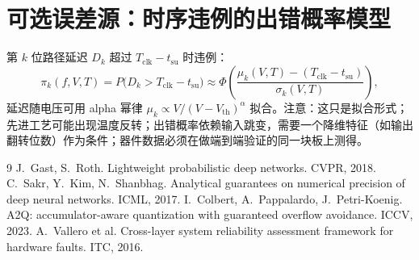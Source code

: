 \documentclass[11pt,a4paper]{ctexart}
\begin{document}
\appendix
\section{可选误差源：时序违例的出错概率模型}
\label{app:timing}
第 $k$ 位路径延迟 $D_k$ 超过 $T_{\text{clk}} - t_{\text{su}}$ 时违例：
\begin{equation}
\pi_k(f,V,T) = P\bigl(D_k > T_{\text{clk}} - t_{\text{su}}\bigr) \approx \Phi\!\left(\frac{\mu_k(V,T) - (T_{\text{clk}} - t_{\text{su}})}{\sigma_k(V,T)}\right),
\end{equation}
延迟随电压可用 alpha 幂律 $\mu_k \propto V/(V - V_{\text{th}})^{\alpha}$ 拟合。注意：这只是拟合形式；先进工艺可能出现温度反转；出错概率依赖输入跳变，需要一个降维特征（如输出翻转位数）作为条件；器件数据必须在做端到端验证的同一块板上测得。

\begin{thebibliography}{9}
 J.~Gast, S.~Roth. Lightweight probabilistic deep networks. CVPR, 2018.
 C.~Sakr, Y.~Kim, N.~Shanbhag. Analytical guarantees on numerical precision of deep neural networks. ICML, 2017.
 I.~Colbert, A.~Pappalardo, J.~Petri-Koenig. A2Q: accumulator-aware quantization with guaranteed overflow avoidance. ICCV, 2023.
 A.~Vallero et al. Cross-layer system reliability assessment framework for hardware faults. ITC, 2016.
\end{thebibliography}
\end{document}

